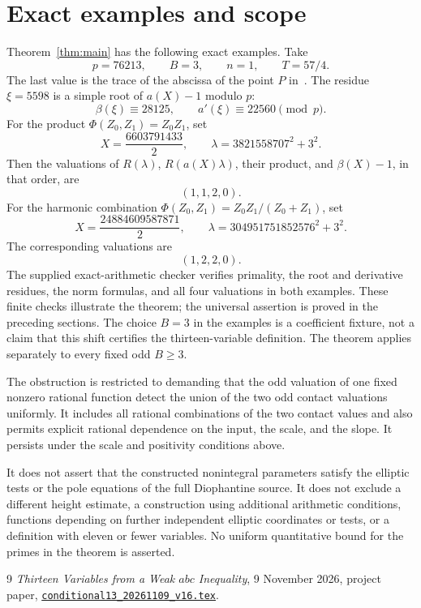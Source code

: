 \documentclass[11pt,a4paper]{article}
\theoremstyle{remark}\newtheorem{remark}[theorem]{Remark}
\begin{document}
\section{Exact examples and scope}

Theorem~\ref{thm:main} has the following exact examples.
Take
\[
                    p=76213,\qquad B=3,\qquad n=1,\qquad T=57/4.
\]
The last value is the trace of the abscissa of the point \(P\)
in~\cite{Conditional13}. The residue \(\xi=5598\) is a simple
root of \(a(X)-1\) modulo \(p\):
\[
             \beta(\xi)\equiv28125,\qquad
             a'(\xi)\equiv22560\pmod p.
\]
For the product \(\Phi(Z_0,Z_1)=Z_0Z_1\), set
\[
             X=\frac{6603791433}{2},\qquad
             \lambda=3821558707^2+3^2.
\]
Then the valuations of \(R(\lambda)\), \(R(a(X)\lambda)\),
their product, and \(\beta(X)-1\), in that order, are
\[
                              (1,1,2,0).
\]
For the harmonic combination
\(\Phi(Z_0,Z_1)=Z_0Z_1/(Z_0+Z_1)\), set
\[
             X=\frac{24884609587871}{2},\qquad
             \lambda=304951751852576^2+3^2.
\]
The corresponding valuations are
\[
                              (1,2,2,0).
\]
The supplied exact-arithmetic checker verifies primality,
the root and derivative residues, the norm formulas, and all
four valuations in both examples. These finite checks
illustrate the theorem; the universal assertion is proved
in the preceding sections. The choice \(B=3\) in the examples
is a coefficient fixture, not a claim that this shift certifies
the thirteen-variable definition. The theorem applies separately
to every fixed odd \(B\ge3\).

The obstruction is restricted to demanding that the odd
valuation of one fixed nonzero rational function detect the
union of the two odd contact valuations uniformly. It includes
all rational combinations of the two contact values and also
permits explicit rational dependence on the input, the scale,
and the slope. It persists under the scale and positivity
conditions above.

It does not assert that the constructed nonintegral parameters
satisfy the elliptic tests or the pole equations of the full
Diophantine source. It does not exclude a different height
estimate, a construction using additional arithmetic conditions,
functions depending on further independent elliptic coordinates
or tests, or a definition with eleven or fewer variables.
No uniform quantitative bound for the primes in the theorem
is asserted.

\begin{thebibliography}{9}
\emph{Thirteen Variables from a Weak \(abc\) Inequality},
9 November 2026, project paper,
\href{https://github.com/JoseBrox/diophantine-z-q_improvements/blob/main/papers/conditional_few_variables/conditional13_20261109_v16.tex}
{\texttt{conditional13\_20261109\_v16.tex}}.
\end{thebibliography}
\end{document}
